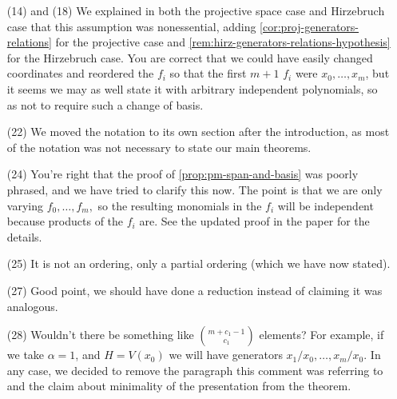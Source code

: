 \documentclass[10 pt]{amsart}
\theoremstyle{plain}
\theoremstyle{definition}
\theoremstyle{remark}
\numberwithin{equation}{section}
\begin{document}
\begin{enumerate}
\item[(14) and (18)]
We explained in both the projective space case and Hirzebruch case that this assumption was nonessential, adding
\autoref{cor:proj-generators-relations} for the projective case
and \autoref{rem:hirz-generators-relations-hypothesis} for the Hirzebruch case.
You are correct that we could have easily changed coordinates and reordered the $f_i$ so that the first $m+1$ $f_i$ were $x_0, \ldots, x_m$, but
it seems we may as well state it with arbitrary independent polynomials, so as not to require such a change of basis.
\item[(22)]
	We moved the notation to its own section after the introduction,
	as most of the notation was not necessary to state
	our main theorems.
\item[(24)]
	You're right that the proof of \autoref{prop:pm-span-and-basis}
		was poorly phrased, and we have tried to clarify this now.
The point is that we are only varying $f_0, \ldots, f_m,$ so
the resulting monomials in the $f_i$ will be independent because products of the $f_i$ are. See the updated proof in the paper for the details.
\item[(25)]
It is not an ordering, only a partial ordering (which we have now stated).
\item[(27)]
Good point, we should have done a reduction instead of claiming it was analogous.
\item[(28)]
Wouldn't there be something like $\binom{m + c_1- 1}{c_1}$ elements? For example, if
we take $\alpha = 1$, and $H = V(x_0)$ we will have generators $x_1/x_0, \ldots, x_m/x_0$.
In any case, we decided to remove the paragraph this comment
was referring to and the claim about minimality
of the presentation from the theorem.
\end{enumerate}
\end{document}
